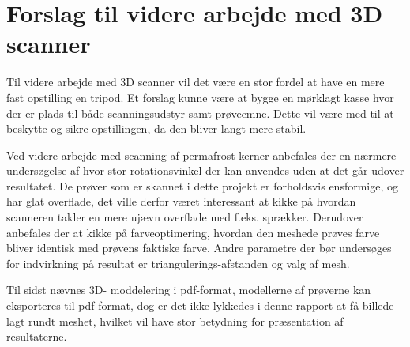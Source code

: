 \chapter{Forslag til videre arbejde med 3D scanner}
Til videre arbejde med 3D scanner vil det være en stor fordel at have en mere fast opstilling en tripod. Et forslag kunne være at bygge en mørklagt kasse hvor der er plads til både scanningsudstyr samt prøveemne. Dette vil være med til at beskytte og sikre opstillingen, da den bliver langt mere stabil.

Ved videre arbejde med scanning af permafrost kerner anbefales der en nærmere undersøgelse af hvor stor rotationsvinkel der kan anvendes uden at det går udover resultatet. De prøver som er skannet i dette projekt er forholdsvis ensformige, og har glat overflade, det ville derfor været interessant at kikke på hvordan scanneren takler en mere ujævn overflade med f.eks. sprækker. 
Derudover anbefales der at kikke på farveoptimering, hvordan den meshede prøves farve bliver identisk med prøvens faktiske farve. 
Andre parametre der bør undersøges for indvirkning på resultat er triangulerings-afstanden og valg af mesh.

Til sidst nævnes 3D- moddelering i pdf-format, modellerne af prøverne kan eksporteres til pdf-format, dog er det ikke lykkedes i denne rapport at få billede lagt rundt meshet, hvilket vil have stor betydning for præsentation af resultaterne.
